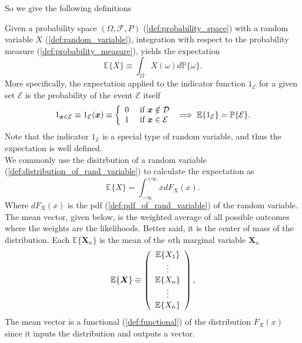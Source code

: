 \documentclass[../main.tex]{subfiles}
\begin{document}
So we give the following definitions

\begin{definition}
Given a probability space $(\Omega, \mathcal{F}, P)$ (\ref{def:probability_space}) with a random variable $X$ (\ref{def:random_variable}), integration with respect to the probability measure (\ref{def:probability_measure}), yields the expectation
\begin{equation}
    \mathbb{E}\{X\}\equiv\int_{\Omega}X(\omega)d\mathbb{P}\{\omega\}\text{.}
\end{equation}
More specifically, the expectation applied to the indicator function $1_\mathcal{E}$ for a given set $\mathcal{E}$ is the probability of the event $\mathcal{E}$ itself
\[
    1_{\boldsymbol{x}\in\mathcal{E}}\equiv1_{\mathcal{E}}(\boldsymbol{x})\equiv\left\{ \begin{array}
    [c]{ll}0 & \text{ if }\boldsymbol{x}\notin\mathcal{D}\\
    1 & \text{ if }\boldsymbol{x}\in\mathcal{E}
    \end{array} \right. \implies \mathbb{E}\{1_{\mathcal{E}}\}=\mathbb{P}\{\mathcal{E}\}\text{.}
\]
Note that the indicator $1_\mathcal{E}$ is a special type of random variable, and thus the expectation is well defined. \\
We commonly use the disitrbution of a random variable (\ref{def:distribution_of_rand_variable}) to calculate the expectation as 
\begin{equation}
    \mathbb{E}\{X\}=\int\nolimits_{-\infty}^{+\infty}xdF_{X}(x)\text{.}
\end{equation}
Where $dF_{X}(x)$ is the pdf (\ref{def:pdf_of_rand_variable}) of the random variable.\\
The mean vector, given below, is the weighted average of all possible outcomes where the weights are the likelihoods. Better said, it is the center of mass of the distribution. Each $\mathbb{E}\{\mathbf{X}_n\}$ is the mean of the $n$th marginal variable $\mathbf{X}_n$
\begin{equation}
    \mathbb{E}\{\boldsymbol{X}\}\equiv\left( \begin{array}
    [c]{c}\mathbb{E}\{X_{1}\}\\
    \vdots\\
    \mathbb{E}\{X_{n}\}\\
    \vdots\\
    \mathbb{E}\{X_{\bar{n}}\}
    \end{array} \right) \text{,}
    \end{equation}
The mean vector is a functional (\ref{def:functional}) of the distribution $F_{X}(x)$ since it inputs the distribution and outputs a vector. 
\end{definition}
\end{document}
